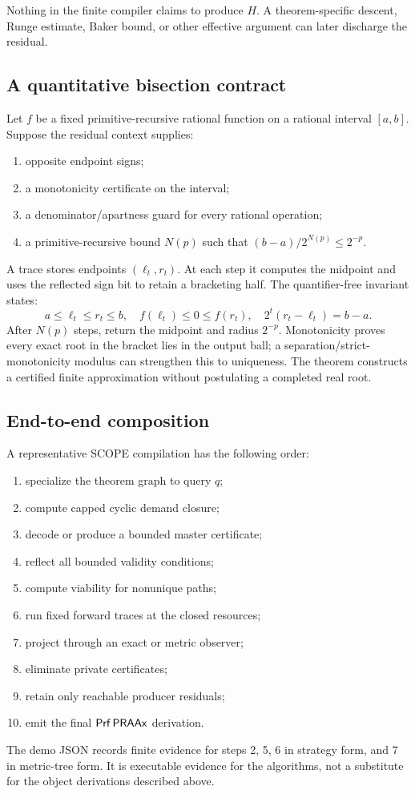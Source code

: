 Nothing in the finite compiler claims to produce \(H\).  A theorem-specific descent, Runge estimate, Baker bound, or other effective argument can later discharge the residual.

\subsection{A quantitative bisection contract}

Let \(f\) be a fixed primitive-recursive rational function on a rational interval \([a,b]\).  Suppose the residual context supplies:

\begin{enumerate}
\item opposite endpoint signs;
\item a monotonicity certificate on the interval;
\item a denominator/apartness guard for every rational operation;
\item a primitive-recursive bound \(N(p)\) such that \((b-a)/2^{N(p)}\le2^{-p}\).
\end{enumerate}

A trace stores endpoints \((\ell_t,r_t)\).  At each step it computes the midpoint and uses the reflected sign bit to retain a bracketing half.  The quantifier-free invariant states:
\[
 a\le\ell_t\le r_t\le b,
 \quad f(\ell_t)\le0\le f(r_t),
 \quad 2^t(r_t-\ell_t)=b-a.
\]
After \(N(p)\) steps, return the midpoint and radius \(2^{-p}\).  Monotonicity proves every exact root in the bracket lies in the output ball; a separation/strict-monotonicity modulus can strengthen this to uniqueness.  The theorem constructs a certified finite approximation without postulating a completed real root.

\subsection{End-to-end composition}

A representative SCOPE compilation has the following order:

\begin{enumerate}
\item specialize the theorem graph to query \(q\);
\item compute capped cyclic demand closure;
\item decode or produce a bounded master certificate;
\item reflect all bounded validity conditions;
\item compute viability for nonunique paths;
\item run fixed forward traces at the closed resources;
\item project through an exact or metric observer;
\item eliminate private certificates;
\item retain only reachable producer residuals;
\item emit the final \(\mathsf{Prf}\,\mathsf{PRAAx}\) derivation.
\end{enumerate}

The demo JSON records finite evidence for steps 2, 5, 6 in strategy form, and 7 in metric-tree form.  It is executable evidence for the algorithms, not a substitute for the object derivations described above.

